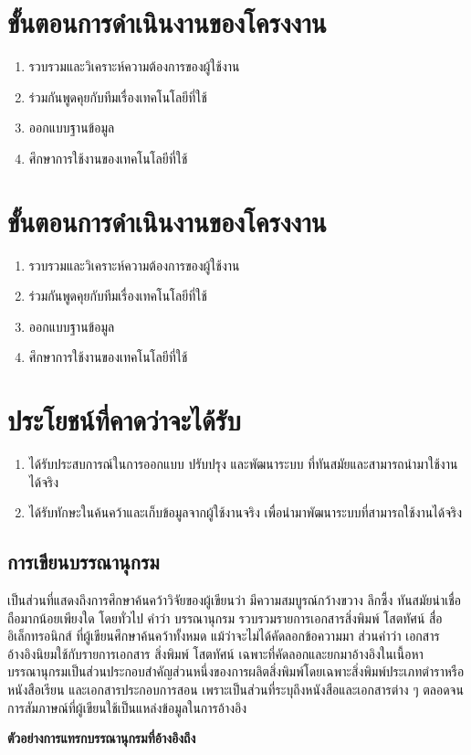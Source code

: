 \section{ขั้นตอนการดำเนินงานของโครงงาน}
\begin{enumerate}
    \item รวบรวมและวิเคราะห์ความต้องการของผู้ใช้งาน
    \item ร่วมกันพูดคุยกับทีมเรื่องเทคโนโลยีที่ใช้
    \item ออกแบบฐานข้อมูล
    \item ศึกษาการใช้งานของเทคโนโลยีที่ใช้
\end{enumerate}

\section{ขั้นตอนการดำเนินงานของโครงงาน}
\begin{enumerate}
    \item รวบรวมและวิเคราะห์ความต้องการของผู้ใช้งาน
    \item ร่วมกันพูดคุยกับทีมเรื่องเทคโนโลยีที่ใช้
    \item ออกแบบฐานข้อมูล
    \item ศึกษาการใช้งานของเทคโนโลยีที่ใช้
\end{enumerate}

\section{ประโยชน์ที่คาดว่าจะได้รับ}
\begin{enumerate}
    \item ได้รับประสบการณ์ในการออกแบบ ปรับปรุง และพัฒนาระบบ ที่ทันสมัยและสามารถนำมาใช้งานได้จริง
    \item ได้รับทักษะในค้นคว้าและเก็บข้อมูลจากผู้ใช้งานจริง เพื่อนำมาพัฒนาระบบที่สามารถใช้งานได้จริง
\end{enumerate}

\subsection{การเขียนบรรณานุกรม}

เป็นส่วนที่แสดงถึงการศึกษาค้นคว้าวิจัยของผู้เขียนว่า มีความสมบูรณ์กว้างขวาง ลึกซึ้ง ทันสมัยน่าเชื่อถือมากน้อยเพียงใด โดยทั่วไป คำว่า บรรณานุกรม รวบรวมรายการเอกสารสิ่งพิมพ์ โสตทัศน์ สื่ออิเล็กทรอนิกส์ ที่ผู้เขียนศึกษาค้นคว้าทั้งหมด แม้ว่าจะไม่ได้คัดลอกข้อความมา ส่วนคำว่า เอกสารอ้างอิงนิยมใช้กับรายการเอกสาร สิ่งพิมพ์ โสตทัศน์ เฉพาะที่คัดลอกและยกมาอ้างอิงในเนื้อหา
บรรณานุกรมเป็นส่วนประกอบสำคัญส่วนหนึ่งของการผลิตสิ่งพิมพ์โดยเฉพาะสิ่งพิมพ์ประเภทตำราหรือหนังสือเรียน และเอกสารประกอบการสอน เพราะเป็นส่วนที่ระบุถึงหนังสือและเอกสารต่าง ๆ ตลอดจนการสัมภาษณ์ที่ผู้เขียนใช้เป็นแหล่งข้อมูลในการอ้างอิง

\textbf{ตัวอย่างการแทรกบรรณานุกรมที่อ้างอิงถึง}

\cite{xieRethinkingSpatiotemporalFeature2018}
\cite{Goodfellow-et-al-2016}
\cite{sunHumanActionRecognition2015}
\cite{wangDeepFaceRecognition2018}
\cite{burtWebVideoPhotos2019}
\cite{sagonasSemiautomaticMethodologyFacial2013}
\cite{fungEndToEndLowResourceLipReading2018}
\cite{petridisVisualOnlyRecognitionNormal2018}
\cite{tranCloserLookSpatiotemporal2017}
\cite{xiaogangwangBoostedMultitaskLearning2009}
\cite{nvidiaTensorFlowDeterminism}
